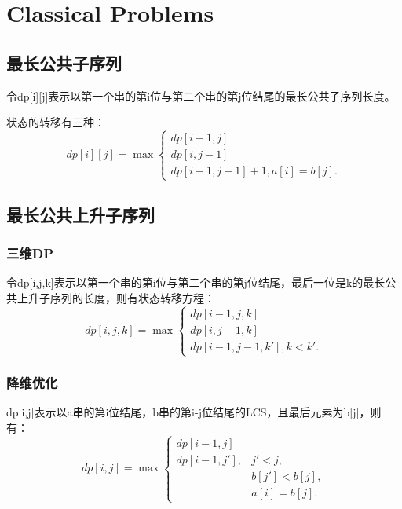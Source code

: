 \documentclass{article}
\begin{document}
\section{Classical Problems}
\subsection{最长公共子序列}
令dp[i][j]表示以第一个串的第i位与第二个串的第j位结尾的最长公共子序列长度。

状态的转移有三种：
\begin{equation*}
    dp[i][j]=\max
    \begin{cases}
        dp[i-1,j]\\
        dp[i,j-1]\\
        dp[i-1,j-1]+1,a[i]=b[j].
    \end{cases}
\end{equation*}
\subsection{最长公共上升子序列}
\subsubsection{三维DP}
令dp[i,j,k]表示以第一个串的第i位与第二个串的第j位结尾，最后一位是k的最长公共上升子序列的长度，则有状态转移方程：
\begin{equation*}
    dp[i,j,k]=\max
    \begin{cases}
        dp[i-1,j,k]\\
        dp[i,j-1,k]\\
        dp[i-1,j-1,k'], k<k'.
    \end{cases}
\end{equation*}

\subsubsection{降维优化}
dp[i,j]表示以a串的第i位结尾，b串的第i-j位结尾的LCS，且最后元素为b[j]，则有：
\begin{equation*}
    dp[i,j]=\max
    \begin{cases}
        dp[i-1,j]\\
        dp[i-1,j'],&j'<j,\\
        &b[j']<b[j],\\
        &a[i]=b[j].
    \end{cases}
\end{equation*}
\end{document}
